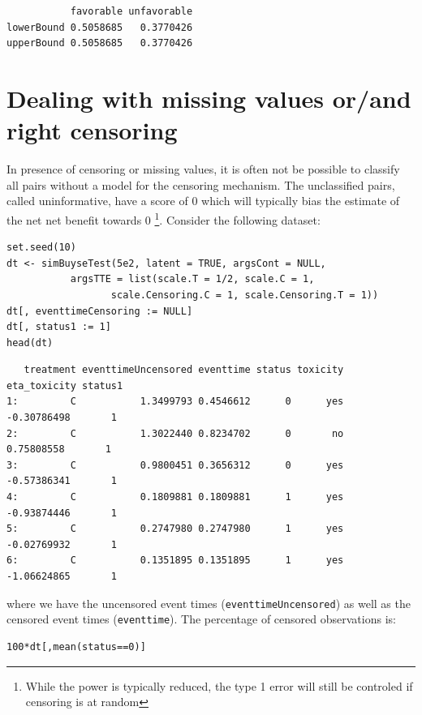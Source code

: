 \documentclass[12pt]{article}
\begin{document}
\begin{verbatim}
           favorable unfavorable
lowerBound 0.5058685   0.3770426
upperBound 0.5058685   0.3770426
\end{verbatim}


\clearpage

\section{Dealing with missing values or/and right censoring}
\label{sec:org9ea73fa}

In presence of censoring or missing values, it is often not be
 possible to classify all pairs without a model for the censoring
 mechanism. The unclassified pairs, called uninformative, have a score
 of 0 which will typically bias the estimate of the net net benefit
 towards 0 \footnote{While the power is typically reduced, the type 1 error
 will still be controled if censoring is at random}. Consider the
 following dataset:
\lstset{language=r,label= ,caption= ,captionpos=b,numbers=none}
\begin{lstlisting}
set.seed(10)
dt <- simBuyseTest(5e2, latent = TRUE, argsCont = NULL,
		   argsTTE = list(scale.T = 1/2, scale.C = 1,
				  scale.Censoring.C = 1, scale.Censoring.T = 1))
dt[, eventtimeCensoring := NULL]
dt[, status1 := 1]
head(dt)
\end{lstlisting}

\begin{verbatim}
   treatment eventtimeUncensored eventtime status toxicity eta_toxicity status1
1:         C           1.3499793 0.4546612      0      yes  -0.30786498       1
2:         C           1.3022440 0.8234702      0       no   0.75808558       1
3:         C           0.9800451 0.3656312      0      yes  -0.57386341       1
4:         C           0.1809881 0.1809881      1      yes  -0.93874446       1
5:         C           0.2747980 0.2747980      1      yes  -0.02769932       1
6:         C           0.1351895 0.1351895      1      yes  -1.06624865       1
\end{verbatim}


where we have the uncensored event times (\texttt{eventtimeUncensored}) as well as the censored event
times (\texttt{eventtime}). The percentage of censored observations is:
\lstset{language=r,label= ,caption= ,captionpos=b,numbers=none}
\begin{lstlisting}
100*dt[,mean(status==0)]
\end{lstlisting}
\end{document}
